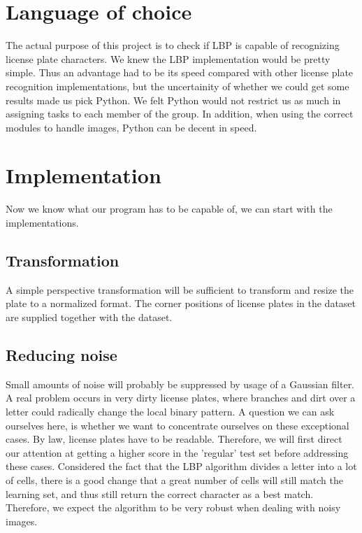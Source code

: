 \documentclass[a4paper]{article}
\begin{document}
\section{Language of choice}

The actual purpose of this project is to check if LBP is capable of recognizing
license plate characters. We knew the LBP implementation would be pretty simple. 
Thus an advantage had to be its speed compared with other license plate 
recognition implementations, but the uncertainity of whether we could get some
results made us pick Python. We felt Python would not restrict us as much in 
assigning tasks to each member of the group. In addition, when using the correct
modules to handle images, Python can be decent in speed.

\section{Implementation}

Now we know what our program has to be capable of, we can start with the
implementations.


\subsection{Transformation}

A simple perspective transformation will be sufficient to transform and resize
the plate to a normalized format. The corner positions of license plates in the
dataset are supplied together with the dataset.

\subsection{Reducing noise}

Small amounts of noise will probably be suppressed by usage of a Gaussian
filter. A real problem occurs in very dirty license plates, where branches and
dirt over a letter could radically change the local binary pattern. A question
we can ask ourselves here, is whether we want to concentrate ourselves on these
exceptional cases. By law, license plates have to be readable. Therefore, we
will first direct our attention at getting a higher score in the 'regular' test
set before addressing these cases. Considered the fact that the LBP algorithm
divides a letter into a lot of cells, there is a good change that a great
number of cells will still match the learning set, and thus still return the
correct character as a best match. Therefore, we expect the algorithm to be
very robust when dealing with noisy images.
\end{document}
